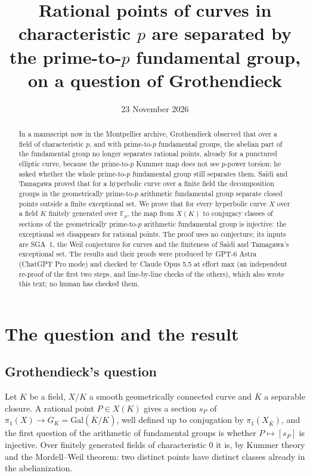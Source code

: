 \documentclass[11pt]{amsart}
\title[Prime-to-$p$ sections separate rational points]{Rational points of curves in characteristic $p$ are separated by the prime-to-$p$ fundamental group, on a question of Grothendieck}
\author{}
\date{23 November 2026}
\theoremstyle{remark}
\newcommand{\F}{\mathbb F}
\begin{document}
\begin{abstract}
In a manuscript now in the Montpellier archive, Grothendieck observed that over a field of characteristic $p$, and with prime-to-$p$ fundamental groups, the abelian part of the fundamental group no longer separates rational points, already for a punctured elliptic curve, because the prime-to-$p$ Kummer map does not see $p$-power torsion; he asked whether the whole prime-to-$p$ fundamental group still separates them. Sa\"idi and Tamagawa proved that for a hyperbolic curve over a finite field the decomposition groups in the geometrically prime-to-$p$ arithmetic fundamental group separate closed points outside a finite exceptional set. We prove that for every hyperbolic curve $X$ over a field $K$ finitely generated over $\F_p$, the map from $X(K)$ to conjugacy classes of sections of the geometrically prime-to-$p$ arithmetic fundamental group is injective: the exceptional set disappears for rational points. The proof uses no conjecture; its inputs are SGA~1, the Weil conjectures for curves and the finiteness of Sa\"idi and Tamagawa's exceptional set. The results and their proofs were produced by GPT-6 Astra (ChatGPT Pro mode) and checked by Claude Opus 5.5 at effort max (an independent re-proof of the first two steps, and line-by-line checks of the others), which also wrote this text; no human has checked them.
\end{abstract}

\maketitle

\section{The question and the result}

\subsection{Grothendieck's question}
Let $K$ be a field, $X/K$ a smooth geometrically connected curve and $\overline K$ a separable closure. A rational point $P\in X(K)$ gives a section $s_P$ of $\pi_1(X)\to G_K=\mathrm{Gal}(\overline K/K)$, well defined up to conjugation by $\pi_1(X_{\overline K})$, and the first question of the arithmetic of fundamental groups is whether $P\mapsto[s_P]$ is injective. Over finitely generated fields of characteristic $0$ it is, by Kummer theory and the Mordell--Weil theorem: two distinct points have distinct classes already in the abelianization.
\end{document}
